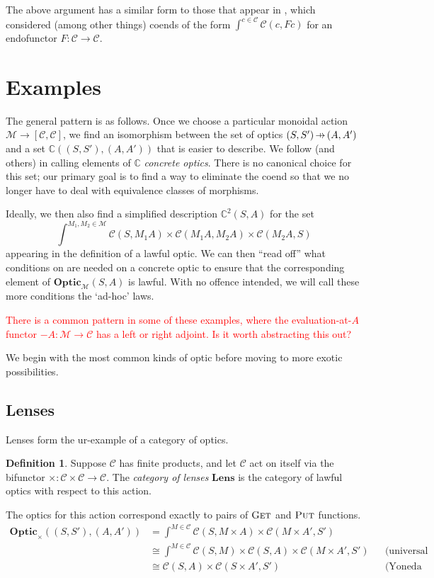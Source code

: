 \documentclass[11pt,a4paper]{article}
\theoremstyle{plain}
\theoremstyle{definition}
\newtheorem{definition}[theorem]{Definition}
\newcommand{\C}{\mathscr{C}}
\newcommand{\M}{\mathscr{M}}
\newcommand{\Optic}{\mathbf{Optic}}
\newcommand{\Lens}{\mathbf{Lens}}
\newcommand{\conc}{\mathbb{C}}
\newcommand{\conctwice}{\mathbb{C}^2}
\newcommand{\fget}{\textsc{Get}}
\newcommand{\fput}{\textsc{Put}}
\newcommand{\hto}{\ensuremath{\,\mathaccent\shortmid\rightarrow\,}}
\newcommand{\todo}[1]{\textcolor{red}{\small #1}}
\begin{document}
The above argument has a similar form to those that appear in \cite{OnTheTrace}, which considered (among other things) coends of the form $\int^{c \in \C} \C(c, Fc)$ for an endofunctor $F : \C \to \C$.

\section{Examples}\label{sec:examples}

The general pattern is as follows. Once we choose a particular monoidal action $\M \to [\C, \C]$, we find an isomorphism between the set of optics $(S, S') \hto (A, A')$ and a set $\conc((S, S'), (A, A'))$ that is easier to describe. We follow \cite{ProfunctorOptics} (and others) in calling elements of $\conc$ \emph{concrete optics}. There is no canonical choice for this set; our primary goal is to find a way to eliminate the coend so that we no longer have to deal with equivalence classes of morphisms.

Ideally, we then also find a simplified description $\conctwice(S, A)$ for the set \[ \int^{M_1, M_2 \in \M} \C(S, M_1 A) \times \C(M_1 A, M_2 A) \times \C(M_2 A, S)\] appearing in the definition of a lawful optic. We can then ``read off'' what conditions on are needed on a concrete optic to ensure that the corresponding element of $\Optic_\M(S, A)$ is lawful. With no offence intended, we will call these more conditions the `ad-hoc' laws.

\todo{There is a common pattern in some of these examples, where the evaluation-at-$A$ functor $-A : \M \to \C$ has a left or right adjoint. Is it worth abstracting this out?}

We begin with the most common kinds of optic before moving to more exotic possibilities.

\subsection{Lenses}

Lenses form the ur-example of a category of optics.

\begin{definition}
  Suppose $\C$ has finite products, and let $\C$ act on itself via the bifunctor $\times : \C \times \C \to \C$. The \emph{category of lenses} $\Lens$ is the category of lawful optics with respect to this action.
\end{definition}

The optics for this action correspond exactly to pairs of $\fget$ and $\fput$ functions.
\begin{align*}
  \Optic_\times((S, S'), (A, A')) &= \int^{M \in \C} \C(S, M \times A) \times \C(M \times A', S') \\
                                  &\cong \int^{M \in \C} \C(S, M) \times \C(S, A) \times \C(M \times A', S') && \text{(universal property of product)} \\
                                  &\cong \C(S, A) \times \C(S \times A', S') && \text{(Yoneda reduction)}
\end{align*}
\end{document}
